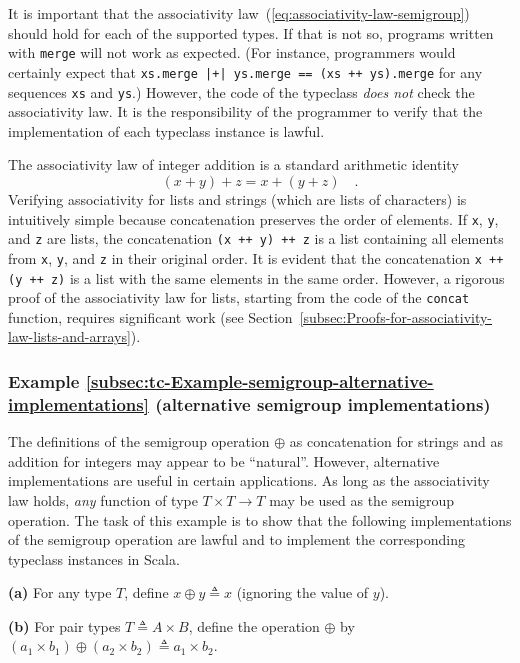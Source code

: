It is important that the associativity law~(\ref{eq:associativity-law-semigroup})
should hold for each of the supported types. If that is not so, programs
written with \lstinline!merge! will not work as expected. (For instance,
programmers would certainly expect that \lstinline!xs.merge |+| ys.merge == (xs ++ ys).merge!
for any sequences \lstinline!xs! and \lstinline!ys!.) However, the
code of the typeclass \emph{does not} check the associativity law.
It is the responsibility of the programmer to verify that the implementation
of each typeclass instance is lawful. 

The associativity law of integer addition is a standard arithmetic
identity
\[
\left(x+y\right)+z=x+\left(y+z\right)\quad.
\]
Verifying associativity for lists and strings (which are lists of
characters) is intuitively simple because concatenation preserves
the order of elements. If \lstinline!x!, \lstinline!y!, and \lstinline!z!
are lists, the concatenation \lstinline!(x ++ y) ++ z! is a list
containing all elements from \lstinline!x!, \lstinline!y!, and \lstinline!z!
in their original order. It is evident that the concatenation \lstinline!x ++ (y ++ z)!
is a list with the same elements in the same order. However, a rigorous
proof of the associativity law for lists, starting from the code of
the \lstinline!concat! function, requires significant work (see Section~\ref{subsec:Proofs-for-associativity-law-lists-and-arrays}). 

\subsubsection{Example \label{subsec:tc-Example-semigroup-alternative-implementations}\ref{subsec:tc-Example-semigroup-alternative-implementations}
(alternative semigroup implementations)}

The definitions of the semigroup operation $\oplus$ as concatenation
for strings and as addition for integers may appear to be ``natural''.
However, alternative implementations are useful in certain applications.
As long as the associativity law holds, \emph{any} function of type
$T\times T\rightarrow T$ may be used as the semigroup operation.
The task of this example is to show that the following implementations
of the semigroup operation are lawful and to implement the corresponding
typeclass instances in Scala.

\textbf{(a)} For any type $T$, define $x\oplus y\triangleq x$ (ignoring
the value of $y$).

\textbf{(b)} For pair types $T\triangleq A\times B$, define the operation
$\oplus$ by $\left(a_{1}\times b_{1}\right)\oplus\left(a_{2}\times b_{2}\right)\triangleq a_{1}\times b_{2}$.

